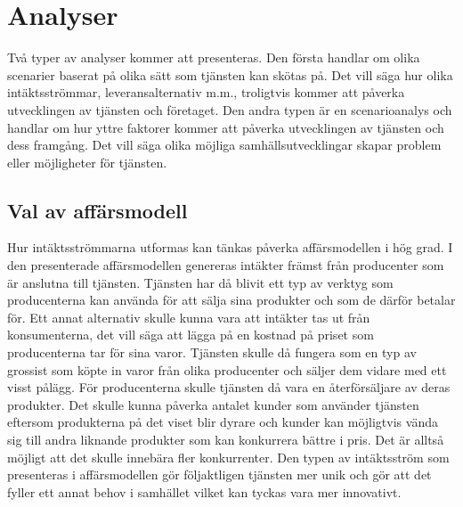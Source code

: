 \documentclass[10pt,a4paper,oneside]{article}
\begin{document}
\newpage

\section{Analyser}
Två typer av analyser kommer att presenteras. Den första handlar om olika scenarier baserat på olika sätt som tjänsten kan skötas på. Det vill säga hur olika intäktsströmmar, leveransalternativ m.m., troligtvis kommer att påverka utvecklingen av tjänsten och företaget. Den andra typen är en scenarioanalys och handlar om hur yttre faktorer kommer att påverka utvecklingen av tjänsten och dess framgång. Det vill säga olika möjliga samhällsutvecklingar skapar problem eller möjligheter för tjänsten. 

\subsection{Val av affärsmodell}
Hur intäktsströmmarna utformas kan tänkas påverka affärsmodellen i hög grad. I den presenterade affärsmodellen genereras intäkter främst från producenter som är anslutna till tjänsten. Tjänsten har då blivit ett typ av verktyg som producenterna kan använda för att sälja sina produkter och som de därför betalar för. Ett annat alternativ skulle kunna vara att intäkter tas ut från konsumenterna, det vill säga att lägga på en kostnad på priset som producenterna tar för sina varor. Tjänsten skulle då fungera som en typ av grossist som köpte in varor från olika producenter och säljer dem vidare med ett visst pålägg. För producenterna skulle tjänsten då vara en återförsäljare av deras produkter. Det skulle kunna påverka antalet kunder som använder tjänsten eftersom produkterna på det viset blir dyrare och kunder kan möjligtvis vända sig till andra liknande produkter som kan konkurrera bättre i pris. Det är alltså möjligt att det skulle innebära fler konkurrenter. Den typen av intäktsström som presenteras i affärsmodellen gör följaktligen tjänsten mer unik och gör att det fyller ett annat behov i samhället vilket kan tyckas vara mer innovativt.  
\end{document}
